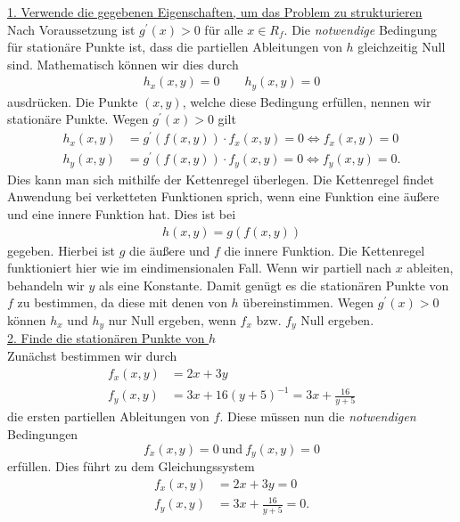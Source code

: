 \underline{1. Verwende die gegebenen Eigenschaften, um das Problem zu strukturieren}\\
Nach Voraussetzung ist $g^\prime(x) > 0$ für alle $x \in R_f$.
Die \textit{notwendige} Bedingung für stationäre Punkte ist, dass die partiellen Ableitungen von $h$ gleichzeitig Null sind.
Mathematisch können wir dies durch
\begin{align*}
h_x(x, y) = 0 \qquad 
h_y(x, y) = 0
\end{align*}
ausdrücken.
Die Punkte $(x, y)$, welche diese Bedingung erfüllen, nennen wir stationäre Punkte.
Wegen $g^\prime(x) > 0 $ gilt
\begin{align*}
h_x(x, y) &=  g^\prime(f(x,y)) \cdot f_x(x,y) = 0
\Leftrightarrow
f_x(x,y) = 0\\
h_y(x,y) &= g^\prime(f(x,y)) \cdot f_y(x,y) = 0 
\Leftrightarrow
f_y(x,y) = 0.
\end{align*}
Dies kann man sich mithilfe der Kettenregel überlegen.
Die Kettenregel findet Anwendung bei verketteten Funktionen sprich, wenn eine Funktion eine äußere und eine innere Funktion hat.
Dies ist bei 
\begin{align*}
h(x,y) = g(f(x,y)) 
\end{align*}
gegeben. Hierbei ist $g$ die äußere und $f$ die innere Funktion.
Die Kettenregel funktioniert hier wie im eindimensionalen Fall.
Wenn wir partiell nach $x$ ableiten, behandeln wir $y$ als eine Konstante.
Damit genügt es die stationären Punkte von $f$ zu bestimmen, da diese mit denen von $h$ übereinstimmen.
Wegen $g^\prime(x) > 0 $ können $h_x$ und $h_y$ nur Null ergeben, wenn $f_x$ bzw. $f_y$ Null ergeben.\\
\newpage
\underline{2. Finde die stationären Punkte von $h$}\\
Zunächst bestimmen wir durch
\begin{equation*}
\begin{split}
f_x(x,y) &= 2x + 3y \\
f_y(x,y) &= 3x + 16 (y+5)^{-1} = 3x + \frac{16}{y+5}
\end{split}
\end{equation*}
die ersten partiellen Ableitungen von $f$.
Diese müssen nun die \textit{notwendigen} Bedingungen
\begin{equation*}
f_x(x,y) = 0 \ \text{und} \ f_y(x,y) = 0
\end{equation*}
erfüllen. Dies führt zu dem Gleichungssystem
\begin{equation*}
\begin{split}
f_x(x,y) &= 2x + 3y = 0\\
f_y(x,y) &=  3x + \frac{16}{y+5} = 0.
\end{split}
\end{equation*}
